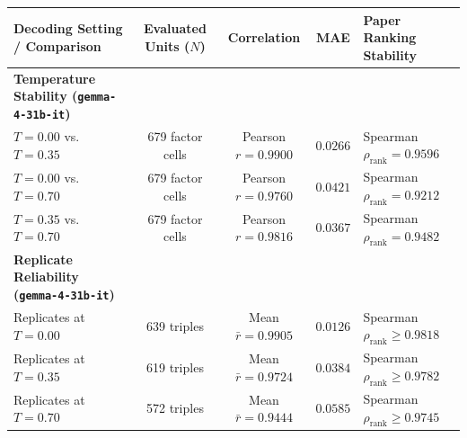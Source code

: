 \documentclass[12pt]{article}
\begin{document}
\begingroup
\small
\setlength{\tabcolsep}{4pt}
\noindent\begin{tabularx}{\textwidth}{@{}p{2.2in} c c c >{\raggedright\arraybackslash}X@{}}
\toprule
\textbf{Decoding Setting / Comparison} & \textbf{Evaluated Units ($N$)} & \textbf{Correlation} & \textbf{MAE} & \textbf{Paper Ranking Stability} \\
\midrule
\textbf{Temperature Stability (\texttt{gemma-4-31b-it})} & & & & \\
\quad $T = 0.00$ vs. $T = 0.35$ & 679 factor cells & Pearson $r = 0.9900$ & $0.0266$ & Spearman $\rho_{\text{rank}} = 0.9596$ \\
\quad $T = 0.00$ vs. $T = 0.70$ & 679 factor cells & Pearson $r = 0.9760$ & $0.0421$ & Spearman $\rho_{\text{rank}} = 0.9212$ \\
\quad $T = 0.35$ vs. $T = 0.70$ & 679 factor cells & Pearson $r = 0.9816$ & $0.0367$ & Spearman $\rho_{\text{rank}} = 0.9482$ \\
\midrule
\textbf{Replicate Reliability (\texttt{gemma-4-31b-it})} & & & & \\
\quad Replicates at $T = 0.00$ & 639 triples & Mean $\bar{r} = 0.9905$ & $0.0126$ & Spearman $\rho_{\text{rank}} \ge 0.9818$ \\
\quad Replicates at $T = 0.35$ & 619 triples & Mean $\bar{r} = 0.9724$ & $0.0384$ & Spearman $\rho_{\text{rank}} \ge 0.9782$ \\
\quad Replicates at $T = 0.70$ & 572 triples & Mean $\bar{r} = 0.9444$ & $0.0585$ & Spearman $\rho_{\text{rank}} \ge 0.9745$ \\
\bottomrule
\end{tabularx}
\endgroup
\vspace{0.4em}
\end{document}
